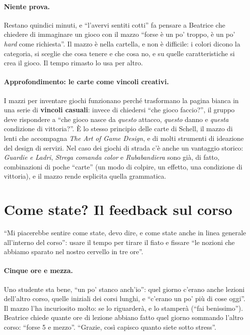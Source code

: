 \paragraph{Niente prova.} Restano quindici minuti, e ``l'avervi sentiti cotti'' fa
pensare a Beatrice che chiedere di immaginare un gioco con il mazzo ``forse è un po'
troppo, è un po' \emph{hard} come richiesta''. Il mazzo è nella cartella, e non è
difficile: i colori dicono la categoria, si sceglie che cosa tenere e che cosa no, e
su quelle caratteristiche si crea il gioco. Il tempo rimasto lo usa per altro.

\paragraph{Approfondimento: le carte come vincoli creativi.} I mazzi per inventare
giochi funzionano perché trasformano la pagina bianca in una serie di \textbf{vincoli
casuali}: invece di chiedersi ``che gioco faccio?'', il gruppo deve rispondere a
``che gioco nasce da \emph{questo} attacco, \emph{questo} danno e \emph{questa}
condizione di vittoria?''. È lo stesso principio delle carte di Schell, il mazzo di
lenti che accompagna \emph{The Art of Game Design}, e di molti strumenti di ideazione
del design di servizi. Nel caso dei giochi di strada c'è anche un vantaggio storico:
\emph{Guardie e Ladri}, \emph{Strega comanda color} e \emph{Rubabandiera} sono già,
di fatto, combinazioni di poche ``carte'' (un modo di colpire, un effetto, una
condizione di vittoria), e il mazzo rende esplicita quella grammatica.

\section{Come state? Il feedback sul corso}
\label{a9:sec:chiusura}

``Mi piacerebbe sentire come state, devo dire, e come state anche in linea generale
all'interno del corso'': usare il tempo per tirare il fiato e fissare ``le nozioni che
abbiamo sparato nel nostro cervello in tre ore''.

\paragraph{Cinque ore e mezza.} Uno studente sta bene, ``un po' stanco anch'io'':
quel giorno c'erano anche lezioni dell'altro corso, quelle iniziali dei corsi lunghi,
e ``c'erano un po' più di cose oggi''. Il mazzo l'ha incuriosito molto: se lo
riguarderà, e lo stamperà (``fai benissimo''). Beatrice chiede quante ore di lezione
abbiano fatto quel giorno sommando l'altro corso: ``forse 5 e mezzo''. ``Grazie, così
capisco quanto siete sotto stress''.

